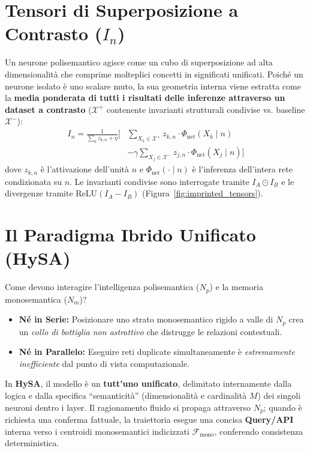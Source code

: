 \documentclass[10pt,twocolumn]{article}
\theoremstyle{definition}
\begin{document}
\section{Tensori di Superposizione a Contrasto \texorpdfstring{($I_n$)}{(In)}}
Un neurone polisemantico agisce come un cubo di superposizione ad alta dimensionalità che comprime molteplici concetti in significati unificati. Poiché un neurone isolato è uno scalare muto, la sua geometria interna viene estratta come la \textbf{media ponderata di tutti i risultati delle inferenze attraverso un dataset a contrasto} ($\mathcal{X}^+$ contenente invarianti strutturali condivise vs. baseline $\mathcal{X}^-$):
\begin{equation}
\begin{aligned}
    I_n = \frac{1}{\sum_{k} z_{k,n} + \eta} \bigg[ & \sum_{X_k \in \mathcal{X}^+} z_{k,n} \cdot \Phi_{\mathrm{net}}(X_k \mid n) \\
    & - \gamma \sum_{X_j \in \mathcal{X}^-} z_{j,n} \cdot \Phi_{\mathrm{net}}(X_j \mid n) \bigg]
\end{aligned}
\label{eq:imprinted_tensor}
\end{equation}
dove $z_{k,n}$ è l'attivazione dell'unità $n$ e $\Phi_{\mathrm{net}}(\cdot \mid n)$ è l'inferenza dell'intera rete condizionata su $n$. Le invarianti condivise sono interrogate tramite $I_A \odot I_B$ e le divergenze tramite $\mathrm{ReLU}(I_A - I_B)$ (Figura~\ref{fig:imprinted_tensors}).

\section{Il Paradigma Ibrido Unificato (HySA)}
Come devono interagire l'intelligenza polisemantica ($N_p$) e la memoria monosemantica ($N_m$)?
\begin{itemize}[leftmargin=*, itemsep=1.5pt, topsep=2pt]
    \item \textbf{Né in Serie:} Posizionare uno strato monosemantico rigido a valle di $N_p$ crea un \textit{collo di bottiglia non astrattivo} che distrugge le relazioni contestuali.
    \item \textbf{Né in Parallelo:} Eseguire reti duplicate simultaneamente è \textit{estremamente inefficiente} dal punto di vista computazionale.
\end{itemize}
In \textbf{HySA}, il modello è un \textbf{tutt'uno unificato}, delimitato internamente dalla logica e dalla specifica ``semanticità'' (dimensionalità e cardinalità $M$) dei singoli neuroni dentro i layer. Il ragionamento fluido si propaga attraverso $N_p$; quando è richiesta una conferma fattuale, la traiettoria esegue una concisa \textbf{Query/API} interna verso i centroidi monosemantici indicizzati $\mathcal{F}_{\mathrm{mono}}$, conferendo consistenza deterministica.
\end{document}
